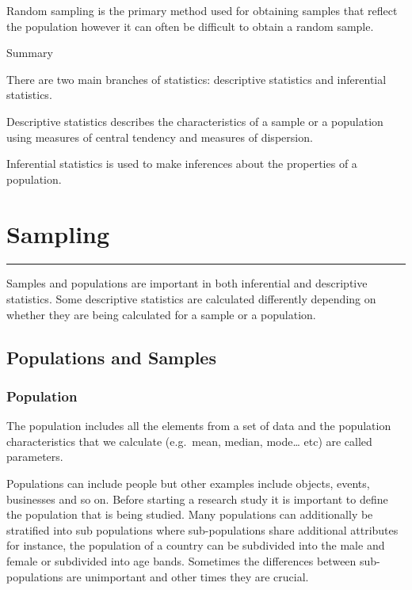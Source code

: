 \documentclass[
]{book}
\begin{document}
Random sampling is the primary method used for obtaining samples that reflect the population however it can often be difficult to obtain a random sample.

Summary

There are two main branches of statistics: descriptive statistics and inferential statistics.

Descriptive statistics describes the characteristics of a sample or a population using measures of central tendency and measures of dispersion.

Inferential statistics is used to make inferences about the properties of a population.

\hypertarget{sampling}{%
\chapter{Sampling}\label{sampling}}

\begin{center}\rule{0.5\linewidth}{0.5pt}\end{center}

Samples and populations are important in both inferential and descriptive statistics. Some descriptive statistics are calculated differently depending on whether they are being calculated for a sample or a population.

\hypertarget{populations-and-samples}{%
\section{Populations and Samples}\label{populations-and-samples}}

\hypertarget{population}{%
\subsection{Population}\label{population}}

The population includes all the elements from a set of data and the population characteristics that we calculate (e.g.~mean, median, mode\ldots{} etc) are called parameters.

Populations can include people but other examples include objects, events, businesses and so on. Before starting a research study it is important to define the population that is being studied. Many populations can additionally be stratified into sub populations where sub-populations share additional attributes \citep{Frost2019} for instance, the population of a country can be subdivided into the male and female or subdivided into age bands. Sometimes the differences between sub-populations are unimportant and other times they are crucial.
\end{document}
